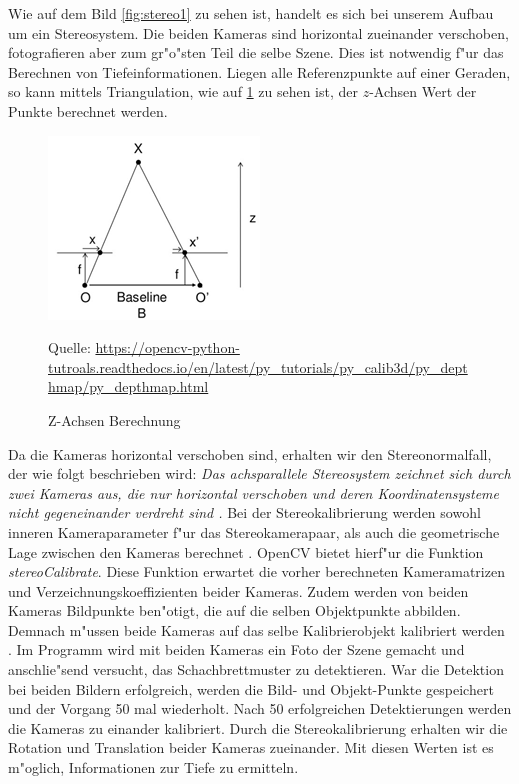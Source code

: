 Wie auf dem Bild \ref{fig:stereo1} zu sehen ist, handelt es sich bei unserem Aufbau um ein Stereosystem. Die beiden Kameras sind horizontal zueinander verschoben, fotografieren aber zum gr"o"sten Teil die selbe Szene. Dies ist notwendig f"ur das Berechnen von Tiefeinformationen. Liegen alle Referenzpunkte auf einer Geraden, so kann mittels Triangulation, wie auf \ref{fig:baseline} zu sehen ist, der $z$-Achsen Wert der Punkte berechnet werden.

\begin{figure}[H]
	\includegraphics[scale=1.5]{bilder/baseline}
	\caption[Z-Achsen Berechnung]{Z-Achsen Berechnung}
	\label{fig:baseline}%
	\small Quelle: \url{https://opencv-python-tutroals.readthedocs.io/en/latest/py_tutorials/py_calib3d/py_depthmap/py_depthmap.html}
\end{figure}

\noindent Da die Kameras horizontal verschoben sind, erhalten wir den Stereonormalfall, der wie folgt beschrieben wird: \textit{Das achsparallele Stereosystem zeichnet sich durch zwei Kameras aus, die nur horizontal verschoben und deren Koordinatensysteme nicht gegeneinander verdreht sind \cite{Tu}.} \newline
\noindent Bei der Stereokalibrierung werden sowohl inneren Kameraparameter f"ur das Stereokamerapaar, als auch die geometrische Lage zwischen den Kameras berechnet \cite{zbs}. OpenCV bietet hierf"ur die Funktion \textit{stereoCalibrate}. Diese Funktion erwartet die vorher berechneten Kameramatrizen und Verzeichnungskoeffizienten beider Kameras. Zudem werden von beiden Kameras Bildpunkte ben"otigt, die auf die selben Objektpunkte abbilden. Demnach m"ussen beide Kameras auf das selbe Kalibrierobjekt kalibriert werden \cite{ocvs}. Im Programm wird mit beiden Kameras ein Foto der Szene gemacht und anschlie"send versucht, das Schachbrettmuster zu detektieren. War die Detektion bei beiden Bildern erfolgreich, werden die Bild- und Objekt-Punkte gespeichert und der Vorgang 50 mal wiederholt. Nach 50 erfolgreichen Detektierungen werden die Kameras zu einander kalibriert.\newline
Durch die Stereokalibrierung erhalten wir die Rotation und Translation beider Kameras zueinander. Mit diesen Werten ist es m"oglich, Informationen zur Tiefe zu ermitteln.

